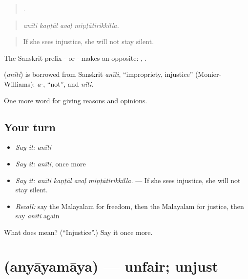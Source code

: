 \begin{quote}
   .
\end{quote}

\begin{quote}
\emph{anīti kaṇṭāl avaḷ miṇṭātirikkilla.}
\end{quote}

\begin{quote}
If she sees injustice, she will not stay silent.
\end{quote}

The Sanskrit prefix - or - makes an opposite: , .

\begin{cousinweb}
\textbf{} (\emph{anīti}) is borrowed from Sanskrit \emph{anīti}, \textquotedblleft{}impropriety, injustice\textquotedblright{} (Monier-Williams): \emph{a-}, \textquotedblleft{}not\textquotedblright{}, and \emph{nīti}.
\end{cousinweb}

\begin{grammarlens}[title={What you've built}]
One more word for giving reasons and opinions.
\end{grammarlens}

\subsection*{Your turn}
\begin{itemize}
\raggedright
  \item \emph{Say it:} \emph{anīti}
  \item \emph{Say it:} \emph{anīti}, once more
  \item \emph{Say it:} \emph{anīti kaṇṭāl avaḷ miṇṭātirikkilla.} — If she sees injustice, she will not stay silent.
  \item \emph{Recall:} say the Malayalam for freedom, then the Malayalam for justice, then say \emph{anīti} again
\end{itemize}

\begin{tcolorbox}[breakable,colback=teal!4,colframe=teal!35!black,title={Before you move on}]
What does  mean? (\textquotedblleft{}Injustice\textquotedblright{}.) Say it once more.
\end{tcolorbox}
\section[\texorpdfstring{\ml{അന്യായമായ} (anyāyamāya)}{അന്യായമായ (anyāyamāya)}]{ (anyāyamāya) — unfair; unjust}

